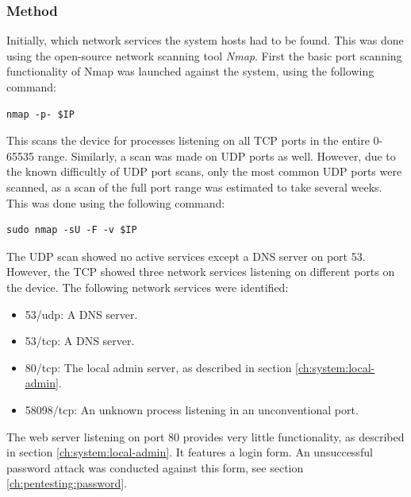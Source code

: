 \subsubsection{Method}
Initially, which network services the system hosts had to be found. This was done using the open-source network scanning tool \textit{Nmap}. First the basic port scanning functionality of Nmap was launched against the system, using the following command:
\begin{lstlisting}[frame=tb]
    nmap -p- $IP
\end{lstlisting}
This scans the device for processes listening on all TCP ports in the entire 0-65535 range. Similarly, a scan was made on UDP ports as well. However, due to the known difficultly of UDP port scans, only the most common UDP ports were scanned, as a scan of the full port range was estimated to take several weeks. This was done using the following command:
\begin{lstlisting}[frame=tb]
    sudo nmap -sU -F -v $IP
\end{lstlisting}
The UDP scan showed no active services except a DNS server on port 53. However, the TCP showed three network services listening on different ports on the device. The following network services were identified:
\begin{itemize}
    \item 53/udp: A DNS server.
    \item 53/tcp: A DNS server.
    \item 80/tcp: The local admin server, as described in section \ref{ch:system:local-admin}.
    \item 58098/tcp: An unknown process listening in an unconventional port.
\end{itemize}
The web server listening on port 80 provides very little functionality, as described in section \ref{ch:system:local-admin}. It features a login form. An unsuccessful password attack was conducted against this form, see section \ref{ch:pentesting:password}.

